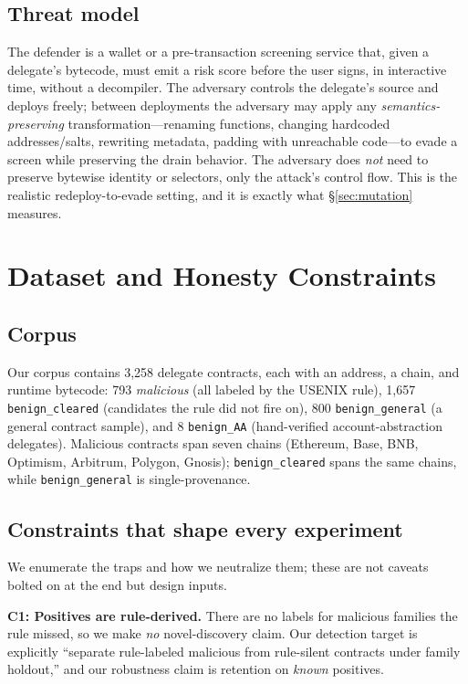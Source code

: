 \documentclass[conference]{IEEEtran}
\newcommand{\code}[1]{\texttt{#1}}
\begin{document}
\subsection{Threat model}
The defender is a wallet or a pre-transaction screening service that, given a delegate's
bytecode, must emit a risk score before the user signs, in interactive time, without a
decompiler. The adversary controls the delegate's source and deploys freely; between
deployments the adversary may apply any \emph{semantics-preserving} transformation---renaming
functions, changing hardcoded addresses/salts, rewriting metadata, padding with unreachable
code---to evade a screen while preserving the drain behavior. The adversary does \emph{not}
need to preserve bytewise identity or selectors, only the attack's control flow. This is the
realistic redeploy-to-evade setting, and it is exactly what \S\ref{sec:mutation} measures.

\section{Dataset and Honesty Constraints}
\label{sec:data}

\subsection{Corpus}
Our corpus contains 3{,}258 delegate contracts, each with an address, a chain, and runtime
bytecode: 793 \emph{malicious} (all labeled by the USENIX rule), 1{,}657
\code{benign\_cleared} (candidates the rule did not fire on), 800 \code{benign\_general}
(a general contract sample), and 8 \code{benign\_AA} (hand-verified account-abstraction
delegates). Malicious contracts span seven chains (Ethereum, Base, BNB, Optimism, Arbitrum,
Polygon, Gnosis); \code{benign\_cleared} spans the same chains, while \code{benign\_general}
is single-provenance.

\subsection{Constraints that shape every experiment}
We enumerate the traps and how we neutralize them; these are not caveats bolted on at the
end but design inputs.

\noindent\textbf{C1: Positives are rule-derived.} There are no labels for malicious families
the rule missed, so we make \emph{no} novel-discovery claim. Our detection target is
explicitly ``separate rule-labeled malicious from rule-silent contracts under family
holdout,'' and our robustness claim is retention on \emph{known} positives.
\end{document}
